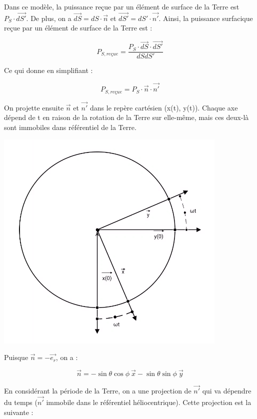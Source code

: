 \documentclass[a4paper,11pt]{article}
\begin{document}
Dans ce modèle, la puissance reçue par un élément de surface de la Terre est $P_S \cdot \overrightarrow{dS'}$. De plus, on a $\overrightarrow{dS} = dS \cdot \vec{n}$ et $\overrightarrow{dS'} = dS' \cdot \vec{n'}$. Ainsi, la puissance surfacique reçue par un élément de surface de la Terre est :

\[ P_{S, reçue} = \dfrac{P_S \cdot \overrightarrow{dS} \cdot \overrightarrow{dS'}}{dSdS'} \]

Ce qui donne en simplifiant :

\[ P_{S,reçue} = P_S \cdot \vec{n} \cdot \vec{n'} \]

On projette ensuite $\vec{n}$ et $\vec{n'}$ dans le repère cartésien (x(t), y(t)). Chaque axe dépend de t en raison de la rotation de la Terre sur elle-même, mais ces deux-là sont immobiles dans référentiel de la Terre.

\begin{adjustbox}{center}
\includegraphics[scale=0.5]{projete_omega_t}
\end{adjustbox}
Puisque $ \vec{n} = -\overrightarrow{e_r}$, on a :

\[ \vec{n} = - \sin \theta \cos \phi ~ \vec{x} - \sin \theta \sin \phi ~ \vec{y} \]

En considérant la période de la Terre, on a une projection de $\vec{n'}$ qui va dépendre du temps ($\vec{n'}$ immobile dans le référentiel héliocentrique). Cette projection est la suivante :
\end{document}
